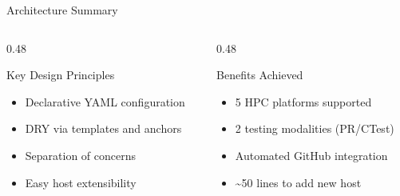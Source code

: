 \documentclass[aspectratio=169]{beamer}
\begin{document}
\begin{frame}[fragile]{Architecture Summary}
\begin{columns}[T]
\begin{column}{0.48\textwidth}
\begin{block}{\textcolor{noaablue}{Key Design Principles}}
\begin{itemize}
    \item Declarative YAML configuration
    \item DRY via templates and anchors
    \item Separation of concerns
    \item Easy host extensibility
\end{itemize}
\end{block}
\end{column}
\begin{column}{0.48\textwidth}
\begin{block}{\textcolor{codegreen}{Benefits Achieved}}
\begin{itemize}
    \item 5 HPC platforms supported
    \item 2 testing modalities (PR/CTest)
    \item Automated GitHub integration
    \item \textasciitilde50 lines to add new host
\end{itemize}
\end{block}
\end{column}
\end{columns}

\end{frame}
\end{document}

